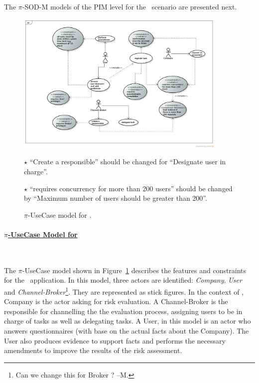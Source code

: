 The $\pi$-SOD-M models of the PIM level  for the \FlyingPig\ scenario are presented next.

\begin{figure}[t]
\centering
\includegraphics[width=0.9\textwidth]{figs/UseCaseGeneral.png}

{\color{red} \raggedright
$\star$ ``Create a responsible'' should be changed for ``Designate user in charge''.

$\star$ ``requires concurrency for more than 200 users'' should be changed by ``Maximum number of users should be greater than 200''.
}
\caption{$\pi$-UseCase model for \FlyingPig.\label{fig:piUseCaseModel}}
\end{figure}


\paragraph{\underline{$\pi$-UseCase Model for \FlyingPig}}~

The $\pi$-UseCase model shown in Figure~\ref{fig:piUseCaseModel} describes the features and constraints for the \FlyingPig\ application. 
In this model, three actors are identified: \textit{Company}, \textit{User} and \textit{Channel-Broker}\footnote{\color{red} Can we change this for Broker ? --M.}. 
They are represented as stick figures.
In the context of \FlyingPig, Company is the actor asking for risk evaluation.
A Channel-Broker is the responsible for channelling the the evaluation process, assigning users to be in charge of tasks as well as delegating tasks. 
A User, in this model is an actor who answers questionnaires (with base on the actual facts about the Company).
The User also produces evidence to support facts and performs the necessary amendments to improve the results of the risk assessment.

